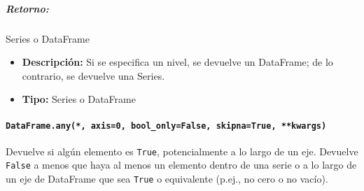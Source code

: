 \subparagraph{Retorno:} Series o DataFrame
\begin{itemize}
    \item \textbf{Descripción:} Si se especifica un nivel, se devuelve un
          DataFrame; de lo contrario, se devuelve una Series.
    \item \textbf{Tipo:} Series o DataFrame
\end{itemize}

\paragraph{\texttt{DataFrame.any(*, axis=0, bool\_only=False, skipna=True,
        **kwargs)}}
Devuelve si algún elemento es \texttt{True}, potencialmente a lo largo de un
eje. Devuelve \texttt{False} a menos que haya al menos un elemento dentro de
una serie o a lo largo de un eje de DataFrame que sea \texttt{True} o
equivalente (p.ej., no cero o no vacío).

